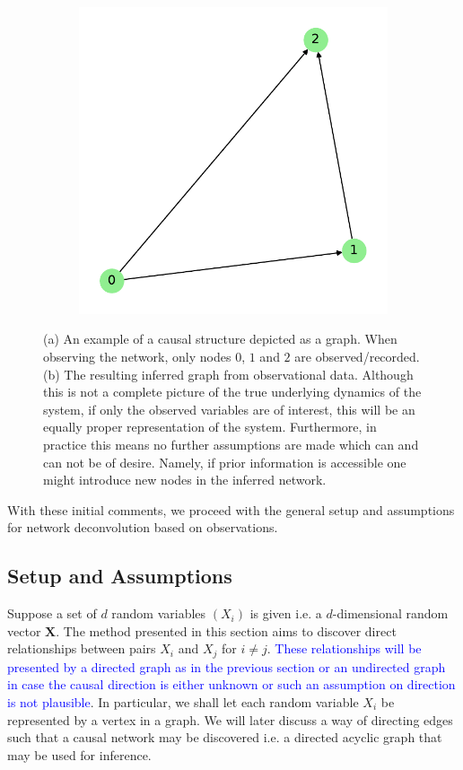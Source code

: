 \documentclass[../Thesis.tex]{subfiles}
\begin{document}
\begin{figure}[t]
\begin{subfigure}[t]{0.49\textwidth}
        \includegraphics[width=\linewidth]{figures/ND examples/Hidden nodes/graph example wo hidden.pdf}
        \caption{}
        \label{subfig:hidden nodes example resulting graph}
    \end{subfigure}
    \caption{(a) An example of a causal structure depicted as a graph. When observing the network, only nodes $0$, $1$ and $2$ are observed/recorded. (b) The resulting inferred graph from observational data. Although this is not a complete picture of the true underlying dynamics of the system, if only the observed variables are of interest, this will be an equally proper representation of the system. Furthermore, in practice this means no further assumptions are made which can and can not be of desire. Namely, if prior information is accessible one might introduce new nodes in the inferred network.}
    \label{fig:hidden nodes example}
\end{figure}
With these initial comments, we proceed with the general setup and assumptions for network deconvolution based on observations.

\subsection{Setup and Assumptions}\label{subsec:Setup and assumptions}
Suppose a set of $d$ random variables $(X_i)$ is given i.e. a $d$-dimensional random vector $\boldsymbol X$. The method presented in this section aims to discover direct relationships between pairs $X_i$ and $X_j$ for $i\neq j$. \textcolor{blue}{These relationships will be presented by a directed graph as in the previous section or an undirected graph in case the causal direction is either unknown or such an assumption on direction is not plausible}. In particular, we shall let each random variable $X_i$ be represented by a vertex in a graph. We will later discuss a way of directing edges such that a causal network may be discovered i.e. a directed acyclic graph that may be used for inference.
\end{document}
